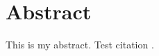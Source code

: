 \chapter*{Abstract}
\thispagestyle{empty}
\setcounter{page}{2}

This is my abstract. Test citation \citep[100]{haigh_classical_2020}.